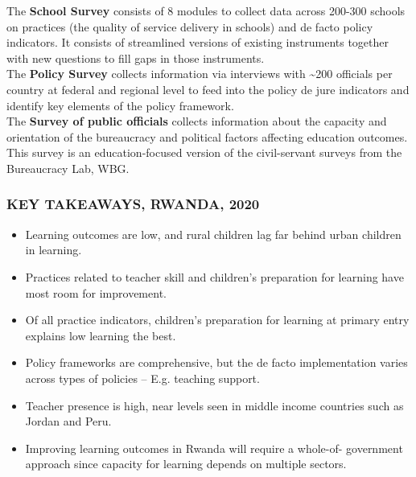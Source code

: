 \documentclass[
]{article}
\providecommand{\tightlist}{%
  \setlength{\itemsep}{0pt}\setlength{\parskip}{0pt}}
\begin{document}
The \textbf{School Survey} consists of 8 modules to collect data across
200-300 schools on practices (the quality of service delivery in
schools) and de facto policy indicators. It consists of streamlined
versions of existing instruments together with new questions to fill
gaps in those instruments.\\
The \textbf{Policy Survey} collects information via interviews with
\textasciitilde200 officials per country at federal and regional level
to feed into the policy de jure indicators and identify key elements of
the policy framework.\\
The \textbf{Survey of public officials} collects information about the
capacity and orientation of the bureaucracy and political factors
affecting education outcomes. This survey is an education-focused
version of the civil-servant surveys from the Bureaucracy Lab, WBG.

\hypertarget{key-takeaways-2020}{%
\subsubsection{\texorpdfstring{\textbf{KEY TAKEAWAYS,
\uppercase{Rwanda},
2020}}{KEY TAKEAWAYS, , 2020}}\label{key-takeaways-2020}}

\begin{itemize}
\tightlist
\item
  Learning outcomes are low, and rural children lag far behind urban
  children in learning.
\item
  Practices related to teacher skill and children's preparation for
  learning have most room for improvement.
\item
  Of all practice indicators, children's preparation for learning at
  primary entry explains low learning the best.
\item
  Policy frameworks are comprehensive, but the de facto implementation
  varies across types of policies -- E.g. teaching support.
\item
  Teacher presence is high, near levels seen in middle income countries
  such as Jordan and Peru.
\item
  Improving learning outcomes in Rwanda will require a whole-of-
  government approach since capacity for learning depends on multiple
  sectors.
\end{itemize}

\setlength\dashlinedash{0.2pt}
\setlength\dashlinegap{1.5pt}
\setlength\arrayrulewidth{0.3pt}
\end{document}
